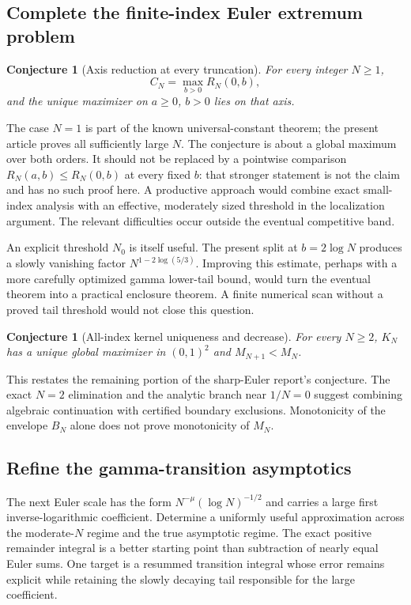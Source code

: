 \documentclass[11pt]{article}
\numberwithin{equation}{section}
\newtheorem{conjecture}[theorem]{Conjecture}
\theoremstyle{definition}
\theoremstyle{remark}
\begin{document}
\subsection{Complete the finite-index Euler extremum problem}

\begin{conjecture}[Axis reduction at every truncation]
\label{conj:all-index-axis}
For every integer $N\geq1$,
\[
 C_N=\max_{b>0}R_N(0,b),
\]
and the unique maximizer on $a\geq0$, $b>0$ lies on that axis.
\end{conjecture}

The case $N=1$ is part of the known universal-constant theorem;
the present article proves all sufficiently large $N$. The conjecture
is about a global maximum over both orders. It should not be replaced
by a pointwise comparison $R_N(a,b)\leq R_N(0,b)$ at every fixed $b$:
that stronger statement is not the claim and has no such proof here.
A productive approach would combine exact small-index analysis with
an effective, moderately sized threshold in the localization argument.
The relevant difficulties occur outside the eventual competitive band.

An explicit threshold $N_0$ is itself useful. The present split at
$b=2\log N$ produces a slowly vanishing factor
$N^{1-2\log(5/3)}$. Improving this estimate, perhaps with a more
carefully optimized gamma lower-tail bound, would turn the eventual
theorem into a practical enclosure theorem. A finite numerical scan
without a proved tail threshold would not close this question.

\begin{conjecture}[All-index kernel uniqueness and decrease]
\label{conj:all-index-kernel}
For every $N\geq2$, $K_N$ has a unique global maximizer in $(0,1)^2$
and $M_{N+1}<M_N$.
\end{conjecture}

This restates the remaining portion of the sharp-Euler report's
conjecture. The exact $N=2$ elimination and the analytic branch near
$1/N=0$ suggest combining algebraic continuation with certified
boundary exclusions. Monotonicity of the envelope $B_N$ alone does
not prove monotonicity of $M_N$.

\subsection{Refine the gamma-transition asymptotics}

The next Euler scale has the form
$N^{-\mu}(\log N)^{-1/2}$ and carries a large first inverse-logarithmic
coefficient. Determine a uniformly useful approximation across the
moderate-$N$ regime and the true asymptotic regime. The exact positive
remainder integral is a better starting point than subtraction of
nearly equal Euler sums. One target is a resummed transition integral
whose error remains explicit while retaining the slowly decaying tail
responsible for the large coefficient.
\end{document}
